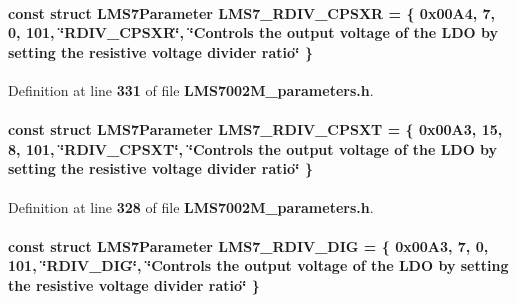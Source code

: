 \paragraph[{L\+M\+S7\+\_\+\+R\+D\+I\+V\+\_\+\+C\+P\+S\+XR}]{\setlength{\rightskip}{0pt plus 5cm}const struct {\bf L\+M\+S7\+Parameter} L\+M\+S7\+\_\+\+R\+D\+I\+V\+\_\+\+C\+P\+S\+XR = \{ 0x00\+A4, 7, 0, 101, \char`\"{}\+R\+D\+I\+V\+\_\+\+C\+P\+S\+X\+R\char`\"{}, \char`\"{}\+Controls the output voltage of the L\+D\+O by setting the resistive voltage divider ratio\char`\"{} \}\hspace{0.3cm}{\ttfamily [static]}}\label{LMS7002M__parameters_8h_a9b59166eaeb482003fc1d28b45a22c38}


Definition at line {\bf 331} of file {\bf L\+M\+S7002\+M\+\_\+parameters.\+h}.

\paragraph[{L\+M\+S7\+\_\+\+R\+D\+I\+V\+\_\+\+C\+P\+S\+XT}]{\setlength{\rightskip}{0pt plus 5cm}const struct {\bf L\+M\+S7\+Parameter} L\+M\+S7\+\_\+\+R\+D\+I\+V\+\_\+\+C\+P\+S\+XT = \{ 0x00\+A3, 15, 8, 101, \char`\"{}\+R\+D\+I\+V\+\_\+\+C\+P\+S\+X\+T\char`\"{}, \char`\"{}\+Controls the output voltage of the L\+D\+O by setting the resistive voltage divider ratio\char`\"{} \}\hspace{0.3cm}{\ttfamily [static]}}\label{LMS7002M__parameters_8h_a0d37798fa7f36aa142c631e1e5386ea9}


Definition at line {\bf 328} of file {\bf L\+M\+S7002\+M\+\_\+parameters.\+h}.

\paragraph[{L\+M\+S7\+\_\+\+R\+D\+I\+V\+\_\+\+D\+IG}]{\setlength{\rightskip}{0pt plus 5cm}const struct {\bf L\+M\+S7\+Parameter} L\+M\+S7\+\_\+\+R\+D\+I\+V\+\_\+\+D\+IG = \{ 0x00\+A3, 7, 0, 101, \char`\"{}\+R\+D\+I\+V\+\_\+\+D\+I\+G\char`\"{}, \char`\"{}\+Controls the output voltage of the L\+D\+O by setting the resistive voltage divider ratio\char`\"{} \}\hspace{0.3cm}{\ttfamily [static]}}\label{LMS7002M__parameters_8h_a85df8b063e181d2632c2c9d7d7cc08e2}


